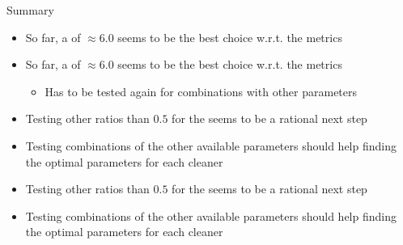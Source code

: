 \begin{frame}{Summary}
    \begin{minipage}[T]{0.48\textwidth}
    \begin{itemize}
        \setlength\itemsep{1em}
        \ifdefined\darktheme
            \item So far, a  of \(\approx\num{6.0}\) seems to be the best choice w.r.t. the metrics
        \else
            \item So far, a  of \(\approx\num{6.0}\) seems to be the best choice w.r.t. the metrics
        \fi
        \begin{itemize}
            \item [\rightarrow] Has to be tested again for combinations with other parameters
        \end{itemize}
        \ifdefined\darktheme
            \item Testing other ratios than \(\num{0.5}\) for the  seems to be a rational next step
            \item Testing combinations of the other available parameters should help finding the optimal parameters for each cleaner
        \else
            \item Testing other ratios than \(\num{0.5}\) for the  seems to be a rational next step
            \item Testing combinations of the other available parameters should help finding the optimal parameters for each cleaner
        \fi
    \end{itemize}
    \end{minipage}
    \begin{minipage}{0.48\textwidth}
    \end{minipage}
\end{frame}